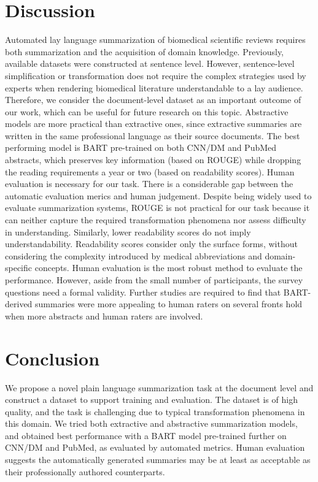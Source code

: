 \documentclass[letterpaper, table]{article} %
\begin{document}
\section{Discussion}
Automated lay language summarization of biomedical scientific reviews requires both summarization and the acquisition of domain knowledge.
Previously, available datasets
were constructed at sentence level. However, sentence-level simplification or transformation does not require the complex strategies used by experts when rendering biomedical literature understandable to a lay audience. Therefore, we consider the
document-level dataset as an important outcome of our work,  which
can be useful for future research on this topic.
Abstractive models are more practical than extractive ones,
since extractive summaries
are written
in the same professional language as their source documents.
The best performing model is BART pre-trained on both CNN/DM and PubMed abstracts, which preserves key information (based on ROUGE) while dropping the reading requirements a year or two (based on readability scores).  Human evaluation is necessary for our task.
There is a considerable gap between the automatic evaluation merics
and human judgement.
Despite being widely used to evaluate summarization systems, ROUGE is not practical for our task because it can neither capture the required transformation phenomena nor assess difficulty in understanding.
Similarly, lower readability scores do not imply understandability.
Readability scores consider only the surface forms,
without considering the complexity introduced by medical abbreviations and domain-specific concepts.
Human evaluation is the most robust method to evaluate the performance.
However, aside from the small number of participants,
the survey questions need a formal validity.
Further studies are required to find that BART-derived summaries were more appealing to human raters on several fronts hold when more abstracts and human raters are involved.






\vspace{-3.14mm}
\section{Conclusion}
We propose a novel plain language summarization task at the document level and construct a dataset to support training and evaluation. The dataset is of high quality, and the task is challenging due to typical transformation phenomena in this domain. We tried both extractive and abstractive summarization models, and obtained best performance with a BART model pre-trained further on CNN/DM and PubMed, as evaluated by automated metrics. Human evaluation suggests the automatically generated summaries may be at least as acceptable as their professionally authored counterparts.
\end{document}
